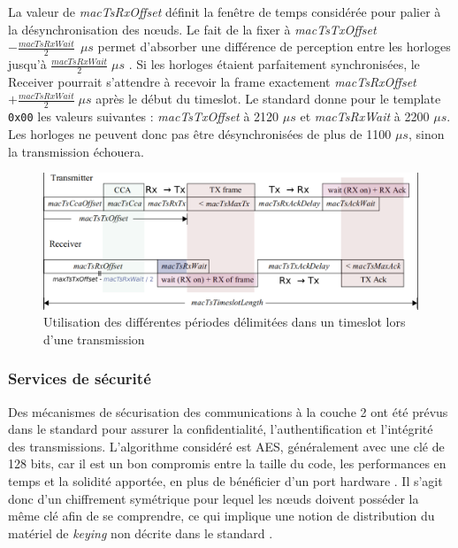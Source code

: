 \documentclass[]{report}
\begin{document}
\vspace{0.4cm}	
	
\par La valeur de \textit{macTsRxOffset} définit la fenêtre de temps considérée pour palier à la désynchronisation des nœuds. Le fait de la fixer à \textit{macTsTxOffset} $- \frac{macTsRxWait}{2} \: \: \mu s$ permet d'absorber une différence de perception entre les horloges jusqu'à $\frac{macTsRxWait}{2} \;\mu s$ \cite{ATP}. Si les horloges étaient parfaitement synchronisées, le Receiver pourrait s'attendre à recevoir la frame exactement \textit{macTsRxOffset} $+ \frac{macTsRxWait}{2} \; \mu s$ après le début du timeslot. Le standard \cite{IEEE802.15.4} donne pour le template \texttt{0x00} les valeurs suivantes : \textit{macTsTxOffset} à 2120 $\mu s$ et \textit{macTsRxWait} à 2200 $\mu s$. Les horloges ne peuvent donc pas être désynchronisées de plus de 1100 $\mu s$, sinon la transmission échouera.

\vspace{0.4cm}

	\begin{figure}[!ht]
	\centering
	\includegraphics[width=\linewidth]{timeslot}
	\caption{Utilisation des différentes périodes délimitées dans un timeslot lors d'une transmission}
	\label{fig:timeslot}
	\end{figure}

\subsubsection{Services de sécurité}
\label{IEEE802.15.4-sec}

Des mécanismes de sécurisation des communications à la couche 2 ont été prévus dans le standard pour assurer la confidentialité, l'authentification et l'intégrité des transmissions. L'algorithme considéré est AES, généralement avec une clé de 128 bits, car il est un bon compromis entre la taille du code, les performances en temps et la solidité apportée, en plus de bénéficier d'un port hardware \cite{link-layer-sec-impact}. Il s'agit donc d'un chiffrement symétrique pour lequel les nœuds doivent posséder la même clé afin de se comprendre, ce qui implique une notion de distribution du matériel de \textit{keying} non décrite dans le standard \cite{IEEE802.15.4}.\\
\end{document}
